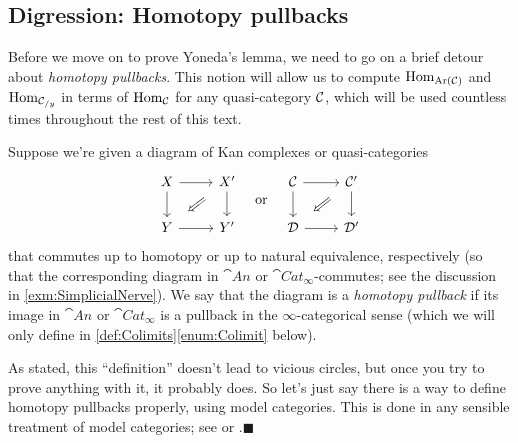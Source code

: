\subsection{Digression: Homotopy pullbacks}
Before we move on to prove Yoneda's lemma, we need to go on a brief detour about \emph{homotopy pullbacks}. This notion will allow us to compute $\operatorname{Hom}_{\operatorname{Ar}(\mathcal{C})}$ and $\operatorname{Hom}_{\mathcal{C}_{/y}}$ in terms of $\operatorname{Hom}_{\mathcal{C}}$ for any quasi-category $\mathcal{C}$, which will be used countless times throughout the rest of this text. 
\begin{numpar}\label{def:HomotopyPullback}
	Suppose we're given a diagram of Kan complexes or quasi-categories
	\begin{equation*}
		\begin{tikzcd}
			X\rar\dar & X'\dlar[phantom,"\Longleftarrow"{sloped}]\dar\\
			Y\rar & Y'
		\end{tikzcd}\quad\text{or}\quad
		\begin{tikzcd}
			\Cc\rar\dar & \Cc'\dlar[phantom,"\Longleftarrow"{sloped}]\dar\\
			\Dd\rar & \Dd'
		\end{tikzcd}
	\end{equation*}
	that commutes up to homotopy or up to natural equivalence, respectively (so that the corresponding diagram in $\cat{An}$ or $\cat{Cat}_\infty$-commutes; see the discussion in \cref{exm:SimplicialNerve}). We say that the diagram is a \emph{homotopy pullback} if its image in $\cat{An}$ or $\cat{Cat}_\infty$ is a pullback in the $\infty$-categorical sense (which we will only define in \cref{def:Colimits}\cref{enum:Colimit} below).
	
	As stated, this \enquote{definition} doesn't lead to vicious circles, but once you try to prove anything with it, it probably does. So let's just say there is a way to define homotopy pullbacks properly, using model categories. This is done in any sensible treatment of model categories; see \cite[Definition~{\href{https://cisinski.app.uni-regensburg.de/CatLR.pdf\#thm.2.3.22}{2.3.22}}]{Cisinski} or \cite[Definition~VIII.49(vi)]{HigherCatsII}.\hfill$\blacksquare$
\end{numpar}
